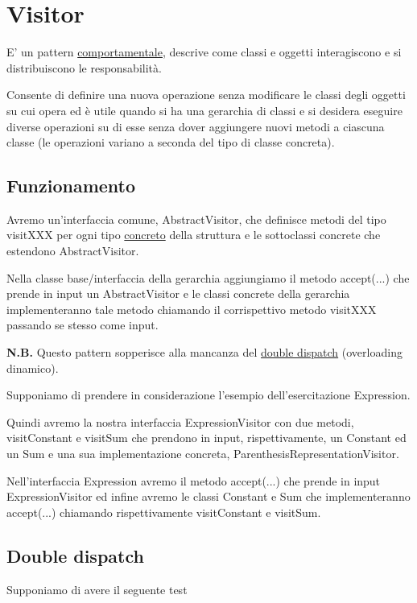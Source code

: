 \chapter{Visitor}

E' un pattern \underline{comportamentale}, descrive come classi e oggetti interagiscono e si distribuiscono le responsabilità. 
\smallskip

Consente di definire una nuova operazione senza modificare le classi degli oggetti su cui opera ed è utile quando si ha una gerarchia di classi e si desidera eseguire 
diverse operazioni su di esse senza dover aggiungere nuovi metodi a ciascuna classe (le operazioni variano a seconda del tipo di classe concreta).

\section{Funzionamento}

Avremo un'interfaccia comune, AbstractVisitor, che definisce metodi del tipo visitXXX per ogni tipo \underline{concreto} della struttura e le sottoclassi concrete che 
estendono AbstractVisitor.

Nella classe base/interfaccia della gerarchia aggiungiamo il metodo accept(...) che prende in input un AbstractVisitor e le classi concrete della gerarchia 
implementeranno tale metodo chiamando il corrispettivo metodo visitXXX passando se stesso come input.
\medskip

\textbf{N.B.} Questo pattern sopperisce alla mancanza del \underline{double dispatch}  (overloading dinamico).
\medskip

Supponiamo di prendere in considerazione l'esempio dell'esercitazione Expression.

Quindi avremo la nostra interfaccia ExpressionVisitor con due metodi, visitConstant e visitSum che prendono in input, rispettivamente, un Constant ed un Sum e una sua 
implementazione concreta, ParenthesisRepresentationVisitor. 

Nell'interfaccia Expression avremo il metodo accept(...) che prende in input ExpressionVisitor ed infine avremo le classi Constant e Sum che implementeranno accept(...) 
chiamando rispettivamente visitConstant e visitSum.

\section{Double dispatch}

Supponiamo di avere il seguente test

